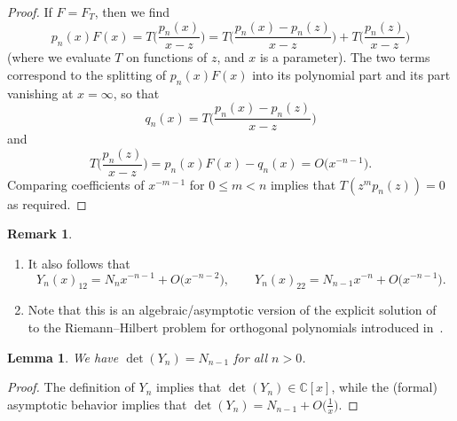 \documentclass[10pt,a4paper]{amsart}
\newcommand{\CN}{\mathbb{C}} %
\newtheorem{Lemma}[Theorem]{Lemma}
\theoremstyle{definition}
\newtheorem{Remark}[Theorem]{Remark}
\numberwithin{equation}{section}
\begin{document}
\begin{proof}
 If $F=F_T$, then we find
 \[
 p_n(x) F(x) = T\bigg(\frac{p_n(x)}{x-z}\bigg) = T\bigg(\frac{p_n(x)-p_n(z)}{x-z}\bigg) +
 T\bigg(\frac{p_n(z)}{x-z}\bigg)
 \]
 (where we evaluate $T$ on functions of $z$, and $x$ is a parameter).
 The two terms correspond to the splitting of $p_n(x)F(x)$ into its
 polynomial part and its part vanishing at $x=\infty$, so that
 \[
 q_n(x) = T\bigg(\frac{p_n(x)-p_n(z)}{x-z}\bigg)
 \]
 and
 \[
 T\bigg(\frac{p_n(z)}{x-z}\bigg) = p_n(x)F(x)-q_n(x) = O\big(x^{-n-1}\big).
 \]
 Comparing coefficients of $x^{-m-1}$ for $0\le m<n$ implies that $T(z^m
 p_n(z))=0$ as required.
\end{proof}

{\samepage
\begin{Remark}\qquad
\begin{enumerate}\itemsep=0pt
\item[1.] It also follows that
 \[
 Y_n(x)_{12}=N_n x^{-n-1}+O\big(x^{-n-2}\big),\qquad Y_n(x)_{22}=N_{n-1} x^{-n}+O\big(x^{-n-1}\big).
 \]

\item[2.] Note that this is an algebraic/asymptotic version of the explicit solution of~\cite{BI} to the Riemann--Hilbert problem for orthogonal polynomials introduced in~\cite{FIK}.
\end{enumerate}
\end{Remark}

}

\begin{Lemma}
 We have $\det(Y_n)=N_{n-1}$ for all $n>0$.
\end{Lemma}

\begin{proof}
 The definition of $Y_n$ implies that $\det(Y_n)\in \CN[x]$, while the
 (formal) asymptotic behavior implies that $\det(Y_n)=N_{n-1}+O\big(\frac{1}{x}\big)$.
\end{proof}
\end{document}
